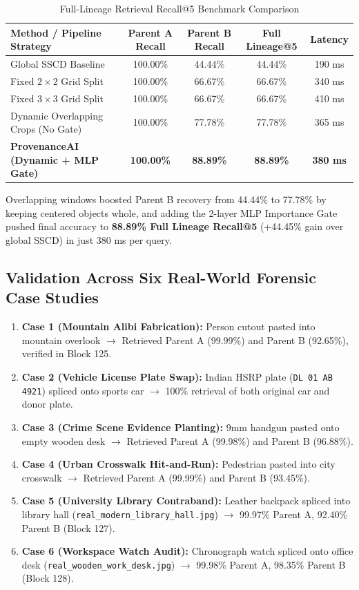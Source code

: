 \documentclass[12pt,a4paper]{article}
\begin{document}
\begin{table}[h]
\centering
\small
\begin{tabular}{l c c c c}
\toprule
\textbf{Method / Pipeline Strategy} & \textbf{Parent A Recall} & \textbf{Parent B Recall} & \textbf{Full Lineage@5} & \textbf{Latency} \\
\midrule
Global SSCD Baseline \cite{sscd} & 100.00\% & 44.44\% & 44.44\% & 190 ms \\
Fixed $2\times2$ Grid Split & 100.00\% & 66.67\% & 66.67\% & 340 ms \\
Fixed $3\times3$ Grid Split & 100.00\% & 66.67\% & 66.67\% & 410 ms \\
Dynamic Overlapping Crops (No Gate) & 100.00\% & 77.78\% & 77.78\% & 365 ms \\
\textbf{ProvenanceAI (Dynamic + MLP Gate)} & \textbf{100.00\%} & \textbf{88.89\%} & \textbf{88.89\%} & \textbf{380 ms} \\
\bottomrule
\end{tabular}
\caption{Full-Lineage Retrieval Recall@5 Benchmark Comparison}
\label{tab:results}
\end{table}

Overlapping windows boosted Parent B recovery from 44.44\% to 77.78\% by keeping centered objects whole, and adding the 2-layer MLP Importance Gate pushed final accuracy to \textbf{88.89\% Full Lineage Recall@5} (+44.45\% gain over global SSCD) in just 380 ms per query.

\subsection{Validation Across Six Real-World Forensic Case Studies}
\begin{enumerate}
    \item \textbf{Case 1 (Mountain Alibi Fabrication):} Person cutout pasted into mountain overlook $\rightarrow$ Retrieved Parent A (99.99\%) and Parent B (92.65\%), verified in Block 125.
    \item \textbf{Case 2 (Vehicle License Plate Swap):} Indian HSRP plate (\texttt{DL 01 AB 4921}) spliced onto sports car $\rightarrow$ 100\% retrieval of both original car and donor plate.
    \item \textbf{Case 3 (Crime Scene Evidence Planting):} 9mm handgun pasted onto empty wooden desk $\rightarrow$ Retrieved Parent A (99.98\%) and Parent B (96.88\%).
    \item \textbf{Case 4 (Urban Crosswalk Hit-and-Run):} Pedestrian pasted into city crosswalk $\rightarrow$ Retrieved Parent A (99.99\%) and Parent B (93.45\%).
    \item \textbf{Case 5 (University Library Contraband):} Leather backpack spliced into library hall (\texttt{real\_modern\_library\_hall.jpg}) $\rightarrow$ 99.97\% Parent A, 92.40\% Parent B (Block 127).
    \item \textbf{Case 6 (Workspace Watch Audit):} Chronograph watch spliced onto office desk (\texttt{real\_wooden\_work\_desk.jpg}) $\rightarrow$ 99.98\% Parent A, 98.35\% Parent B (Block 128).
\end{enumerate}
\end{document}

